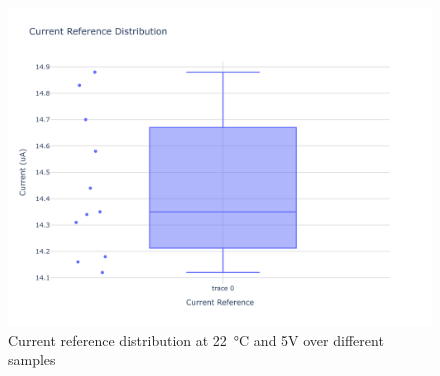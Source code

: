 \begin{figure}[ht]
	\centering
	\includegraphics[width=\textwidth]{images/Current_Reference_Distribution.png}
	\caption{Current reference distribution at \qty{22}{\degreeCelsius} and 5V over different samples}
	\label{fig:current_source_distr}
\end{figure}
\clearpage
